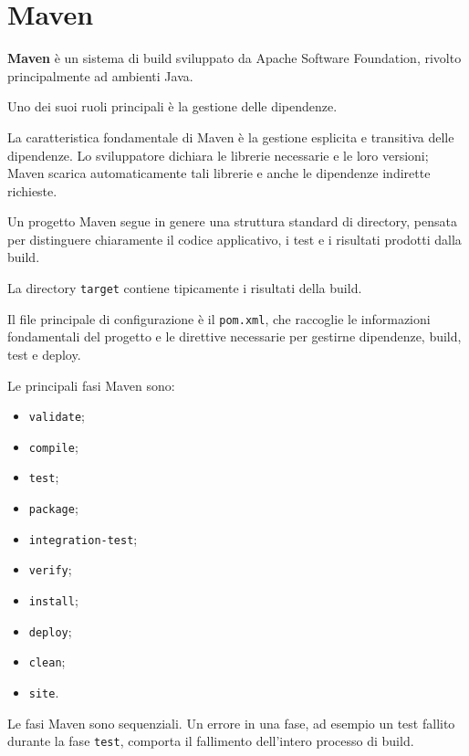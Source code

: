\section{Maven}

\textbf{Maven} è un sistema di build sviluppato da Apache Software Foundation, rivolto principalmente ad ambienti Java.

Uno dei suoi ruoli principali è la gestione delle dipendenze.

\begin{notaprof}
La caratteristica fondamentale di Maven è la gestione esplicita e transitiva delle dipendenze. Lo sviluppatore dichiara le librerie necessarie e le loro versioni; Maven scarica automaticamente tali librerie e anche le dipendenze indirette richieste.
\end{notaprof}

Un progetto Maven segue in genere una struttura standard di directory, pensata per distinguere chiaramente il codice applicativo, i test e i risultati prodotti dalla build.

La directory \texttt{target} contiene tipicamente i risultati della build.

Il file principale di configurazione è il \texttt{pom.xml}, che raccoglie le informazioni fondamentali del progetto e le direttive necessarie per gestirne dipendenze, build, test e deploy.

Le principali fasi Maven sono:

\begin{itemize}
    \item \texttt{validate};
    \item \texttt{compile};
    \item \texttt{test};
    \item \texttt{package};
    \item \texttt{integration-test};
    \item \texttt{verify};
    \item \texttt{install};
    \item \texttt{deploy};
    \item \texttt{clean};
    \item \texttt{site}.
\end{itemize}

\begin{notaesame}
Le fasi Maven sono sequenziali. Un errore in una fase, ad esempio un test fallito durante la fase \texttt{test}, comporta il fallimento dell'intero processo di build.
\end{notaesame}

